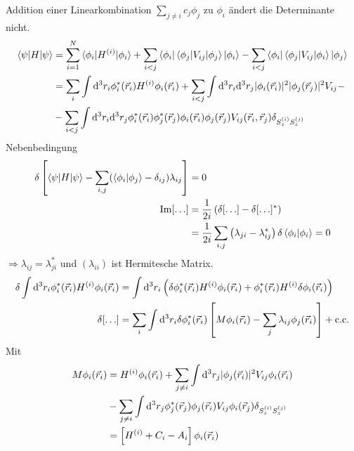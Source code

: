 Addition einer Linearkombination $\sum \limits_{j \neq i} c_j \phi_j$ zu $\phi_i$ ändert die Determinante nicht.
	\begin{align*}
		\braket{\psi | H | \psi} &=
		\sum_{i=1}^{N} \braket{\phi_i | H^{(i)} | \phi_i}
		+ \sum_{i<j} \braket{\phi_i | \braket{\phi_j | V_{ij} | \phi_j} | \phi_i}
		- \sum_{i<j} \braket{\phi_i | \braket{\phi_j | V_{ij} | \phi_i} | \phi_j} \\
		&= \sum_i \int \mathrm{d}^3 r_i \phi_i^* (\vec{r}_i) H^{(i)} \phi_i (\vec{r}_i) 
		+ \sum_{i<j} \int \mathrm{d}^3 r_i \mathrm{d}^3 r_j |\phi_i (\vec{r}_i)|^2 |\phi_j (\vec{r}_j)|^2 V_{ij} -\\
		&- \sum_{i<j} \int \mathrm{d}^3 r_i \mathrm{d}^3 r_j \phi_i^* (\vec{r}_i) \phi_j^* (\vec{r}_j) 
		 \phi_i (\vec{r}_i) \phi_j (\vec{r}_j) V_{ij}(\vec{r}_i, \vec{r}_j) 
		 \delta_{S_z^{(i)} S_z^{(j)}}
	\end{align*}
Nebenbedingung
	\begin{align*}
		\delta \left[ \braket{\psi | H | \psi} - \sum_{i,j} (\braket{\phi_i | \phi_j} - \delta_{ij}) \lambda_{ij}
		\right] &= 0 \\
		\mathrm{Im} [\ldots] &= 
		\frac{1}{2i} \left(\delta[\ldots] - \delta[\ldots]^*\right) \\
		&= \frac{1}{2i} \sum_{i,j} \left(\lambda_{ji} - \lambda_{ij}^*\right)
		\delta \braket{\phi_i | \phi_i} = 0
	\end{align*}
$\Rightarrow \lambda_{ij} = \lambda_{ji}^*$ und $(\lambda_{ii})$ ist Hermitesche Matrix. 
	\begin{align*}
		\delta \int \mathrm{d}^3 r_i \phi_i^* (\vec{r}_i) H^{(i)} \phi_i (\vec{r}_i)
		&= \int \mathrm{d}^3 r_i
		\left(
			\delta \phi_i^* (\vec{r}_i) H^{(i)} \phi_i (\vec{r}_i) 
			+ \phi_i^* (\vec{r}_i) H^{(i)} \delta \phi_i (\vec{r}_i) 
		\right) \\
		\delta [\ldots] &= \sum_i \int \mathrm{d}^3 r_i \delta \phi_i^* (\vec{r}_i)
		\left[
			M \phi_i(\vec{r}_i) - \sum_j \lambda_{ij} \phi_j (\vec{r}_i)
		\right] + \text{c.c.}
	\end{align*}
Mit
	\begin{align*}
		M \phi_i (\vec{r}_i) &=
		H^{(i)} \phi_i (\vec{r}_i) + \sum_{j \neq i} \int \mathrm{d}^3 r_j |\phi_j (\vec{r}_i)|^2 V_{ij} \phi_i(\vec{r}_i) \\
		&- \sum_{j \neq i} \int \mathrm{d}^3 r_j \phi_j^* (\vec{r}_j) \phi_j (\vec{r}_i) V_{ij}
		\phi_i (\vec{r}_j) \delta_{S_z^{(i)} S_z^{(j)}} \\
		&= \left[H^{(i)} + C_i - A_i\right] \phi_i(\vec{r}_i)
	\end{align*}
